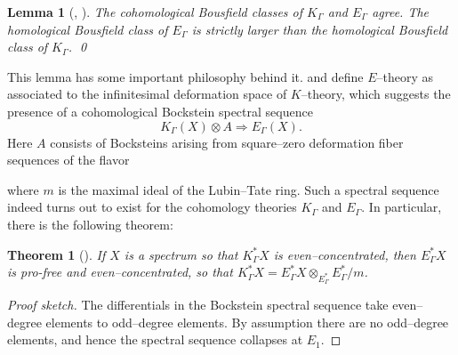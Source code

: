 \documentclass{amsart}
\newcommand{\m}{m}
\newcommand{\<}{\langle}
\renewcommand{\>}{\rangle}
\newcommand{\Susp}{\Sigma}
\theoremstyle{plain}
\newtheorem*{theorem}{Theorem}
\newtheorem*{lemma}{Lemma}
\theoremstyle{definition}
\theoremstyle{remark}
\begin{document}
\begin{lemma}[{, }]\label{BadBousfieldClasses}
The cohomological Bousfield classes of $K_\Gamma$ and $E_\Gamma$ agree.  The homological Bousfield class of $E_\Gamma$ is strictly larger than the homological Bousfield class of $K_\Gamma$. \qed
\end{lemma}

\noindent This lemma has some important philosophy behind it.   and  define $E$--theory as associated to the infinitesimal deformation space of $K$--theory, which suggests the presence of a cohomological Bockstein spectral sequence \[K_\Gamma(X) \otimes A \Rightarrow E_\Gamma(X).\]  Here $A$ consists of Bocksteins arising from square--zero deformation fiber sequences of the flavor
\begin{center}
\end{center}
where $\m$ is the maximal ideal of the Lubin--Tate ring.  Such a spectral sequence indeed turns out to exist for the cohomology theories $K_\Gamma$ and $E_\Gamma$.  In particular, there is the following theorem:
\begin{theorem}[{\cite[Proposition 2.5]{HoveyStrickland}}]\label{GoodCohomBousfieldClass}
If $X$ is a spectrum so that $K_\Gamma^* X$ is even--concentrated, then $E_\Gamma^* X$ is pro-free and even--concentrated, so that $K_\Gamma^* X = E_\Gamma^* X \otimes_{E_\Gamma^*} E_\Gamma^* / \m$.
\end{theorem}
\begin{proof}[Proof sketch]
The differentials in the Bockstein spectral sequence take even--degree elements to odd--degree elements. By assumption there are no odd--degree elements, and hence the spectral sequence collapses at $E_1$.
\end{proof}
\end{document}
